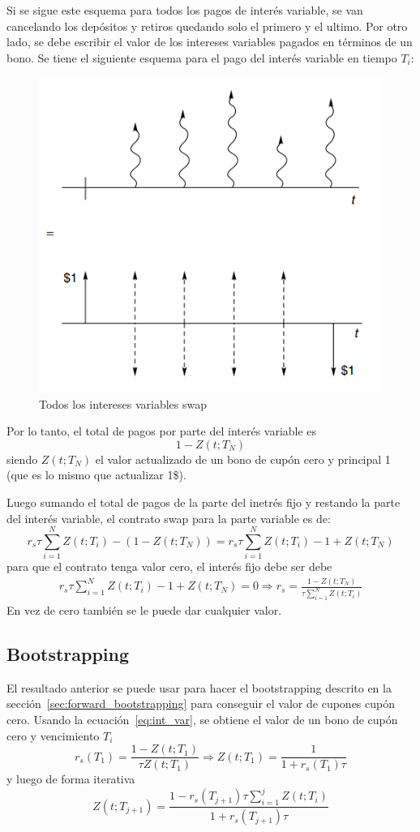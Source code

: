 Si se sigue este esquema para todos los pagos de interés variable, se van cancelando los depósitos y retiros quedando solo el primero y el ultimo.
Por otro lado, se debe escribir el valor de los intereses variables pagados en términos de un bono. Se tiene el siguiente esquema para el pago del interés variable en tiempo $T_i$:
 \begin{figure}[H]
    \centering
    \includegraphics[width=0.65\linewidth]{Imagenes/Parte1/12_swaps/Interes_variable_swaps.png}
    \caption{Todos los intereses variables swap}
\end{figure}
Por lo tanto, el total de pagos por parte del interés variable es
\[
    1 - Z(t;T_N)
\]
siendo $Z(t;T_N)$ el valor actualizado de un bono de cupón cero y principal 1 (que es lo mismo que actualizar 1\$). 

Luego sumando el total de pagos de la parte del inetrés fijo y restando la parte del interés variable, el contrato swap para la parte variable es de:
\[
    r_s\tau \sum_{i=1}^N Z(t;T_i) - (1 - Z(t;T_N)) = \boxed{r_s\tau \sum_{i=1}^N Z(t;T_i) - 1 + Z(t;T_N)}
\]
para que el contrato tenga valor cero, el interés fijo debe ser debe
\begin{align}\label{eq:int_var}
    r_s\tau \sum_{i=1}^N Z(t;T_i) - 1 + Z(t;T_N) = 0 \Rightarrow \boxed{r_s = \frac{1 - Z(t;T_N)}{\tau \sum_{i=1}^N Z(t;T_i)}}
\end{align}
En vez de cero también se le puede dar cualquier valor.




\subsection{Bootstrapping}
El resultado anterior se puede usar para hacer el bootstrapping descrito en la sección~\ref{sec:forward_bootstrapping} para conseguir el valor de cupones cupón cero. Usando la ecuación~\eqref{eq:int_var}, se obtiene el valor de un bono de cupón cero y vencimiento $T_i$
\[
    r_s(T_1) = \frac{1 - Z(t;T_1)}{\tau Z(t;T_1)} \Rightarrow \boxed{Z(t;T_1) = \frac{1}{1+r_s(T_1)\tau}}
\]
y luego de forma iterativa
\[
    \boxed{Z(t; T_{j+1}) = \frac{1 - r_s(T_{j+1})\tau \sum_{i=1}^{j} Z(t; T_i)}{1 + r_s(T_{j+1})\tau}}
\]







